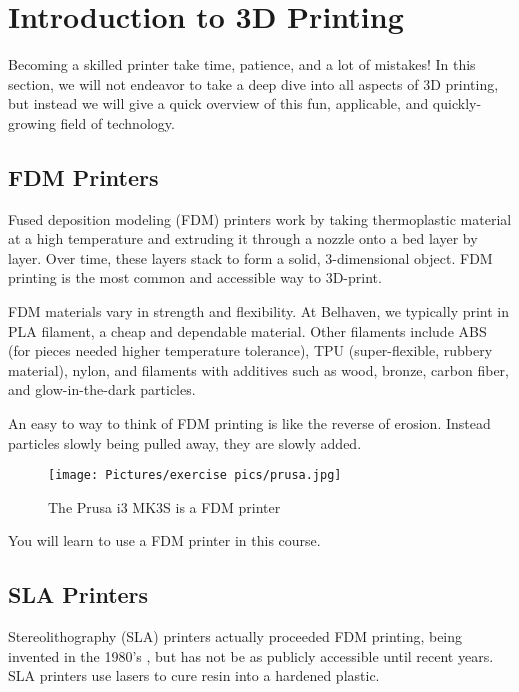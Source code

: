 
\section{Introduction to 3D Printing}\label{3dprint}

Becoming a skilled printer take time, patience, and a lot of mistakes! In this section, we will not endeavor to take a deep dive into all aspects of 3D printing, but instead we will give a quick overview of this fun, applicable, and quickly-growing field of technology.

\subsection{FDM Printers}

Fused deposition modeling (FDM) printers work by taking thermoplastic material at a high temperature and extruding it through a nozzle onto a bed layer by layer. Over time, these layers stack to form a solid, 3-dimensional object. FDM printing is the most common and accessible way to 3D-print. 

\noindent FDM materials vary in strength and flexibility. At Belhaven, we typically print in PLA filament, a cheap and dependable material. Other filaments include ABS (for pieces needed higher temperature tolerance), TPU (super-flexible, rubbery material), nylon, and filaments with additives such as wood, bronze, carbon fiber, and glow-in-the-dark particles.

\begin{remark}
An easy to way to think of FDM printing is like the reverse of erosion. Instead particles slowly being pulled away, they are slowly added.
\end{remark}

\begin{figure}[h]
    \centering
    \texttt{[image: Pictures/exercise pics/prusa.jpg]}
    \caption{The Prusa i3 MK3S is a FDM printer}
    \label{fig:prusai3}
\end{figure}

\noindent You will learn to use a FDM printer in this course.

\subsection{SLA Printers}

Stereolithography (SLA) printers actually proceeded FDM printing, being invented in the 1980's \cite{formlabs}, but has not be as publicly accessible until recent years. SLA printers use lasers to cure resin into a hardened plastic.

